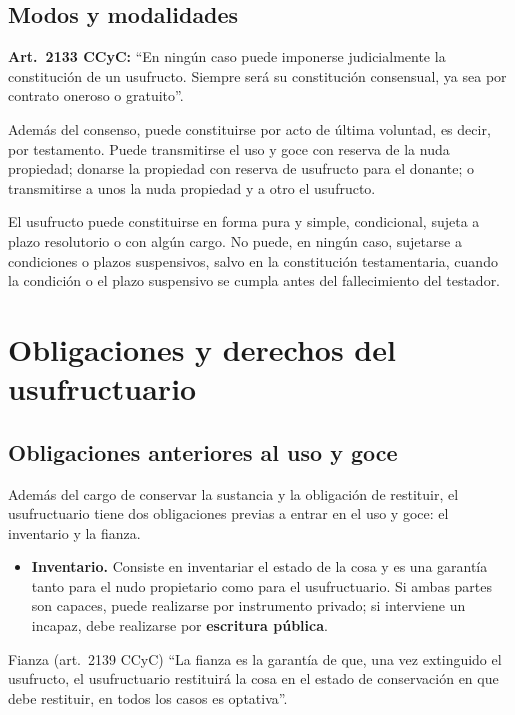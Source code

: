 \documentclass[12pt,oneside]{book}
\begin{document}
\subsection{Modos y modalidades}

\begin{important}
\textbf{Art.~2133 CCyC:} ``En ningún caso puede imponerse judicialmente la constitución de un usufructo. Siempre será su constitución consensual, ya sea por contrato oneroso o gratuito''.
\end{important}

Además del consenso, puede constituirse por acto de última voluntad, es decir, por testamento. Puede transmitirse el uso y goce con reserva de la nuda propiedad; donarse la propiedad con reserva de usufructo para el donante; o transmitirse a unos la nuda propiedad y a otro el usufructo.

El usufructo puede constituirse en forma pura y simple, condicional, sujeta a plazo resolutorio o con algún cargo. No puede, en ningún caso, sujetarse a condiciones o plazos suspensivos, salvo en la constitución testamentaria, cuando la condición o el plazo suspensivo se cumpla antes del fallecimiento del testador.

\section{Obligaciones y derechos del usufructuario}

\subsection{Obligaciones anteriores al uso y goce}

Además del cargo de conservar la sustancia y la obligación de restituir, el usufructuario tiene dos obligaciones previas a entrar en el uso y goce: el inventario y la fianza.

\begin{itemize}
    \item \textbf{Inventario.} Consiste en inventariar el estado de la cosa y es una garantía tanto para el nudo propietario como para el usufructuario. Si ambas partes son capaces, puede realizarse por instrumento privado; si interviene un incapaz, debe realizarse por \textbf{escritura pública}.
\end{itemize}

\begin{definition}{Fianza (art.~2139 CCyC)}
``La fianza es la garantía de que, una vez extinguido el usufructo, el usufructuario restituirá la cosa en el estado de conservación en que debe restituir, en todos los casos es optativa''.
\end{definition}
\end{document}
